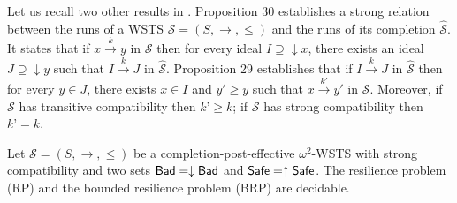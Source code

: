 Let us recall two other results in \cite{BFM-ic17}. Proposition 30 establishes a strong relation between the runs of a WSTS $\mathscr{S}=(S,\rightarrow, \leq)$ and the runs of its completion $\hat{\mathscr{S}}$. It states that if $x \xrightarrow{k} y$ in $\mathscr{S}$ then for every ideal $I \supseteq \downarrow x$, there exists an ideal $J \supseteq \downarrow y$ such that $I \xrightarrow{k} J$ in $\hat{\mathscr{S}}$. Proposition 29 establishes that if $I \xrightarrow{k} J$ in $\hat{\mathscr{S}}$ then for every $y \in J$, there exists $x \in I$ and $y' \geq y$ such that $x \xrightarrow{k'} y'$ in $\mathscr{S}$. Moreover, if $\mathscr{S}$ has transitive compatibility then $k’ \geq k$; if $\mathscr{S}$ has strong compatibility then $k’ = k$.


\begin{theorem}\label{down-up}
Let $\mathscr{S}=(S,\rightarrow, \leq)$ be a completion-post-effective $\omega^2$-WSTS with strong compatibility and two 
 sets $\textsf{Bad} = \downarrow \textsf{Bad}$ and $\textsf{Safe} = \uparrow \textsf{Safe}$.
The resilience problem (RP) and the bounded resilience problem (BRP) are decidable.
\end{theorem}

